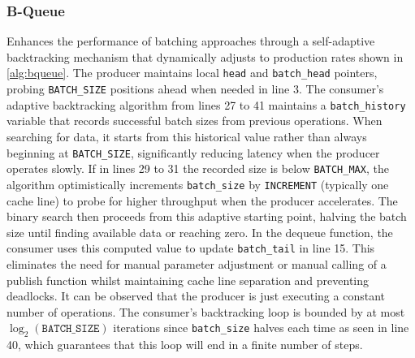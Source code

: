 \subsubsection{B-Queue}
Enhances the performance of batching approaches through a self-adaptive backtracking mechanism that dynamically adjusts to production rates shown in \cref{alg:bqueue}. The producer maintains local \texttt{head} and \texttt{batch\_head} pointers, probing \texttt{BATCH\_SIZE} positions ahead when needed in line 3. The consumer's adaptive backtracking algorithm from lines 27 to 41 maintains a \texttt{batch\_history} variable that records successful batch sizes from previous operations. When searching for data, it starts from this historical value rather than always beginning at \texttt{BATCH\_SIZE}, significantly reducing latency when the producer operates slowly. If in lines 29 to 31 the recorded size is below \texttt{BATCH\_MAX}, the algorithm optimistically increments \texttt{batch\_size} by \texttt{INCREMENT} (typically one cache line) to probe for higher throughput when the producer accelerates. The binary search then proceeds from this adaptive starting point, halving the batch size until finding available data or reaching zero. In the dequeue function, the consumer uses this computed value to update \texttt{batch\_tail} in line 15. This eliminates the need for manual parameter adjustment or manual calling of a publish function whilst maintaining cache line separation and preventing deadlocks. It can be observed that the producer is just executing a constant number of operations. The consumer's backtracking loop is bounded by at most $\log_2(\texttt{BATCH\_SIZE})$ iterations since \texttt{batch\_size} halves each time as seen in line 40, which guarantees that this loop will end in a finite number of steps. \cite{Wang2013BQueue}

